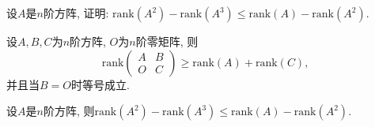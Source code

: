 \documentclass[a4paper,12pt]{ctexart}
\title{\TITLE}
\author{\AUTHOR}
\date{\today}
\newcommand{\rank}{\mathrm{rank}}
\begin{document}

    \maketitle




    \pagestyle{fancy}
    \linenumbers
    
    \begin{problem}
        设$A$是$n$阶方阵, 证明: $\rank(A^2)-\rank(A^3)\leq\rank(A)-\rank(A^2)$.
    \end{problem}

    \begin{lemma}
        设$A,B,C$为$n$阶方阵, $O$为$n$阶零矩阵, 则
        \begin{equation}
            \label{lemma_rank}
            \rank
            \begin{pmatrix}
                A & B\\
                O & C
            \end{pmatrix}
            \geq \rank(A)+\rank(C),
        \end{equation}
        并且当$B=O$时等号成立.
    \end{lemma}

    \begin{theorem}
        设$A$是$n$阶方阵, 则$\rank(A^2)-\rank(A^3)\leq\rank(A)-\rank(A^2)$.
    \end{theorem}
\end{document}
